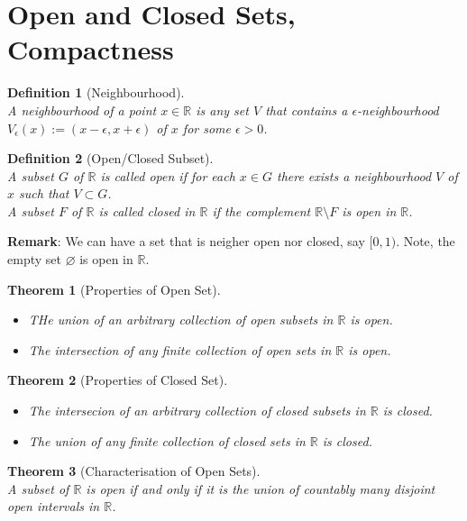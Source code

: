 \documentclass[12pt]{article}
\newtheorem{definition}{Definition}[section]
\newtheorem{theorem}{Theorem}[section]
\theoremstyle{definition}
\begin{document}
\section{Open and Closed Sets, Compactness}
\begin{definition}[Neighbourhood]
\hfill\\\normalfont A neighbourhood of a point $x\in\mathbb{R}$ is any set $V$ that contains a $\epsilon$-neighbourhood $V_\epsilon(x):=(x-\epsilon, x+\epsilon)$ of $x$ for some $\epsilon>0$. 
\end{definition}
\begin{definition}[Open/Closed Subset]
\hfill\\\normalfont A subset $G$ of $\mathbb{R}$ is called open if for each $x\in G$ there exists a neighbourhood $V$ of $x$ such that $V\subset G$.\\
A subset $F$ of $\mathbb{R}$ is called closed in $\mathbb{R}$ if the complement $\mathbb{R}\setminus F$ is open in $\mathbb{R}$.
\end{definition}
\textbf{Remark}: We can have a set that is neigher open nor closed, say $[0,1)$. Note, the empty set $\varnothing$ is open in $\mathbb{R}$.
\begin{theorem}[Properties of Open Set]
\hfill\\\normalfont \begin{itemize}
\item THe union of an arbitrary collection of open subsets in $\mathbb{R}$ is open.
\item The intersection of any finite collection of open sets in $\mathbb{R}$ is open.
\end{itemize}
\end{theorem}
\begin{theorem}[Properties of Closed Set]
\hfill\\\normalfont \begin{itemize}
\item The intersecion of an arbitrary collection of closed subsets in $\mathbb{R}$ is closed.
\item The union of any finite collection of closed sets in $\mathbb{R}$ is closed.
\end{itemize}
\end{theorem}
\begin{theorem}[Characterisation of Open Sets]
\hfill\\\normalfont A subset of $\mathbb{R}$ is open if and only if it is the union of countably many disjoint open intervals in $\mathbb{R}$.
\end{theorem}
\end{document}
